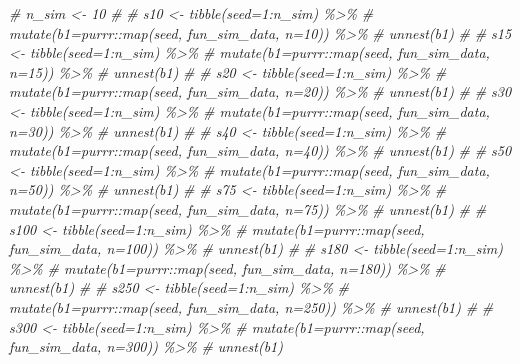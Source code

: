 \documentclass[
]{article}
\newenvironment{Shaded}{\begin{snugshade}}{\end{snugshade}}
\newcommand{\CommentTok}[1]{\textcolor[rgb]{0.56,0.35,0.01}{\textit{#1}}}
\begin{document}
\begin{Shaded}
\begin{Highlighting}[]
\CommentTok{\# n\_sim \textless{}{-} 10}
\CommentTok{\# }
\CommentTok{\# s10 \textless{}{-} tibble(seed=1:n\_sim) \%\textgreater{}\% }
\CommentTok{\#   mutate(b1=purrr::map(seed, fun\_sim\_data, n=10)) \%\textgreater{}\% }
\CommentTok{\#   unnest(b1)}
\CommentTok{\# }
\CommentTok{\# s15 \textless{}{-} tibble(seed=1:n\_sim) \%\textgreater{}\% }
\CommentTok{\#   mutate(b1=purrr::map(seed, fun\_sim\_data, n=15)) \%\textgreater{}\% }
\CommentTok{\#   unnest(b1)}
\CommentTok{\# }
\CommentTok{\# s20 \textless{}{-} tibble(seed=1:n\_sim) \%\textgreater{}\% }
\CommentTok{\#   mutate(b1=purrr::map(seed, fun\_sim\_data, n=20)) \%\textgreater{}\% }
\CommentTok{\#   unnest(b1)}
\CommentTok{\# }
\CommentTok{\# s30 \textless{}{-} tibble(seed=1:n\_sim) \%\textgreater{}\% }
\CommentTok{\#   mutate(b1=purrr::map(seed, fun\_sim\_data, n=30)) \%\textgreater{}\% }
\CommentTok{\#   unnest(b1)}
\CommentTok{\# }
\CommentTok{\# s40 \textless{}{-} tibble(seed=1:n\_sim) \%\textgreater{}\% }
\CommentTok{\#   mutate(b1=purrr::map(seed, fun\_sim\_data, n=40)) \%\textgreater{}\% }
\CommentTok{\#   unnest(b1)}
\CommentTok{\# }
\CommentTok{\# s50 \textless{}{-} tibble(seed=1:n\_sim) \%\textgreater{}\% }
\CommentTok{\#   mutate(b1=purrr::map(seed, fun\_sim\_data, n=50)) \%\textgreater{}\% }
\CommentTok{\#   unnest(b1)}
\CommentTok{\# }
\CommentTok{\# s75 \textless{}{-} tibble(seed=1:n\_sim) \%\textgreater{}\% }
\CommentTok{\#   mutate(b1=purrr::map(seed, fun\_sim\_data, n=75)) \%\textgreater{}\% }
\CommentTok{\#   unnest(b1)}
\CommentTok{\# }
\CommentTok{\# s100 \textless{}{-} tibble(seed=1:n\_sim) \%\textgreater{}\% }
\CommentTok{\#   mutate(b1=purrr::map(seed, fun\_sim\_data, n=100)) \%\textgreater{}\% }
\CommentTok{\#   unnest(b1)}
\CommentTok{\# }
\CommentTok{\# s180 \textless{}{-} tibble(seed=1:n\_sim) \%\textgreater{}\% }
\CommentTok{\#   mutate(b1=purrr::map(seed, fun\_sim\_data, n=180)) \%\textgreater{}\% }
\CommentTok{\#   unnest(b1)}
\CommentTok{\# }
\CommentTok{\# s250 \textless{}{-} tibble(seed=1:n\_sim) \%\textgreater{}\% }
\CommentTok{\#   mutate(b1=purrr::map(seed, fun\_sim\_data, n=250)) \%\textgreater{}\% }
\CommentTok{\#   unnest(b1)}
\CommentTok{\# }
\CommentTok{\# s300 \textless{}{-} tibble(seed=1:n\_sim) \%\textgreater{}\% }
\CommentTok{\#   mutate(b1=purrr::map(seed, fun\_sim\_data, n=300)) \%\textgreater{}\% }
\CommentTok{\#   unnest(b1)}
\end{Highlighting}
\end{Shaded}
\end{document}
